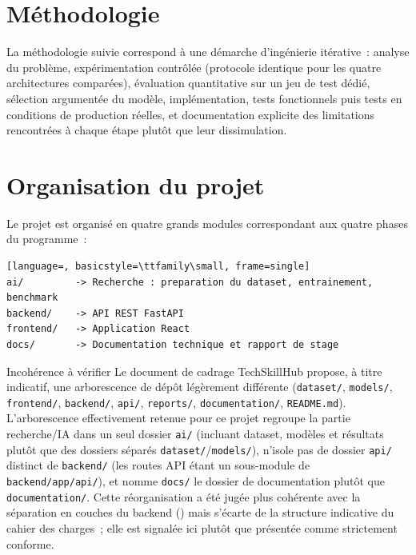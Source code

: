 \section{M\'ethodologie}

La m\'ethodologie suivie correspond \`a une d\'emarche d'ing\'enierie it\'erative~: analyse du probl\`eme, exp\'erimentation contr\^ol\'ee (protocole identique pour les quatre architectures compar\'ees), \'evaluation quantitative sur un jeu de test d\'edi\'e, s\'election argument\'ee du mod\`ele, impl\'ementation, tests fonctionnels puis tests en conditions de production r\'eelles, et documentation explicite des limitations rencontr\'ees \`a chaque \'etape plut\^ot que leur dissimulation.

\section{Organisation du projet}

Le projet est organis\'e en quatre grands modules correspondant aux quatre phases du programme~:

\begin{lstlisting}[language=, basicstyle=\ttfamily\small, frame=single]
ai/         -> Recherche : preparation du dataset, entrainement, benchmark
backend/    -> API REST FastAPI
frontend/   -> Application React
docs/       -> Documentation technique et rapport de stage
\end{lstlisting}

\begin{noteflag}{Incoh\'erence \`a v\'erifier}
Le document de cadrage TechSkillHub propose, \`a titre indicatif, une arborescence de d\'ep\^ot l\'eg\`erement diff\'erente (\texttt{dataset/}, \texttt{models/}, \texttt{frontend/}, \texttt{backend/}, \texttt{api/}, \texttt{reports/}, \texttt{documentation/}, \texttt{README.md}). L'arborescence effectivement retenue pour ce projet regroupe la partie recherche/IA dans un seul dossier \texttt{ai/} (incluant dataset, mod\`eles et r\'esultats plut\^ot que des dossiers s\'epar\'es \texttt{dataset/}/\texttt{models/}), n'isole pas de dossier \texttt{api/} distinct de \texttt{backend/} (les routes API \'etant un sous-module de \texttt{backend/app/api/}), et nomme \texttt{docs/} le dossier de documentation plut\^ot que \texttt{documentation/}. Cette r\'eorganisation a \'et\'e jug\'ee plus coh\'erente avec la s\'eparation en couches du backend () mais s'\'ecarte de la structure indicative du cahier des charges~; elle est signal\'ee ici plut\^ot que pr\'esent\'ee comme strictement conforme.
\end{noteflag}

